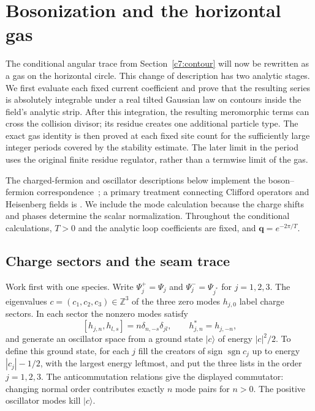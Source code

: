\section{Bosonization and the horizontal gas}\label{c7:boson}

The conditional angular trace from Section~\ref{c7:contour} will now be
rewritten as a gas on the horizontal circle.  This change of description
has two analytic stages.  We first evaluate each fixed current coefficient
and prove that the resulting series is absolutely integrable under a real
tilted Gaussian law on contours inside the field's analytic strip.  After this integration,
the resulting meromorphic terms can cross the collision divisor; its residue
creates one additional particle type.  The exact gas identity is then proved
at each fixed site count for the sufficiently large integer periods covered
by the stability estimate.  The later limit in the period uses the original
finite residue regulator, rather than a termwise limit of the gas.

The charged-fermion and oscillator descriptions below implement the
boson--fermion correspondence~\cite{Frenkel1981}; a primary treatment
connecting Clifford operators and Heisenberg fields is
\cite[Sections~6.4 and 8.1]{FrenkelJingWang2000}.  We include the mode calculation
because the charge shifts and phases determine the scalar normalization.
Throughout the conditional calculations, $T>0$ and the analytic loop
coefficients are fixed, and $\mathbf q=e^{-2\pi/T}$.

\subsection{Charge sectors and the seam trace}

Work first with one species.  Write
$\Psi_j^+=\Psi_j$ and $\Psi_j^-=\Psi_{j^*}$ for $j=1,2,3$.
The eigenvalues $c=(c_1,c_2,c_3)\in\mathbb Z^3$ of the three zero modes
$h_{j,0}$ label charge sectors.  In each sector the nonzero modes satisfy
\[
[h_{j,n},h_{l,s}]=n\delta_{n,-s}\delta_{jl},\qquad
h_{j,n}^*=h_{j,-n},
\]
and generate an oscillator space from a ground state $|c\rangle$ of energy
$|c|^2/2$.  To define this ground state, for each $j$ fill the creators of
sign $\operatorname{sgn}c_j$ up to energy $|c_j|-1/2$, with the largest
energy leftmost, and put the three lists in the order $j=1,2,3$.
The anticommutation relations give the displayed commutator: changing
normal order contributes exactly $n$ mode pairs for $n>0$.  The positive
oscillator modes kill $|c\rangle$.

